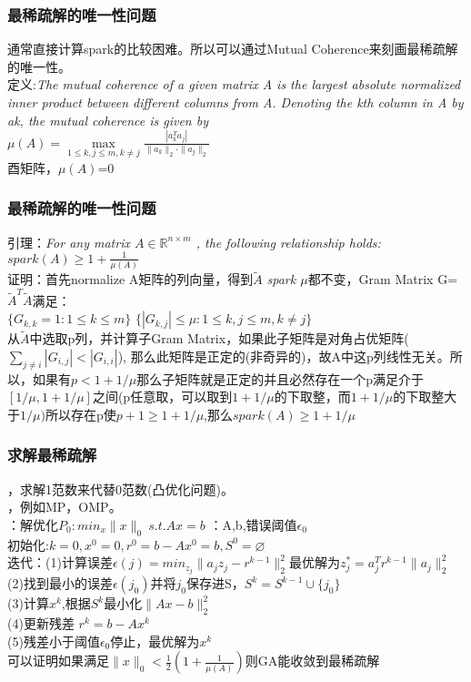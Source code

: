 \documentclass[UTF8]{beamer}
\begin{document}
\begin{frame}\frametitle{最稀疏解的唯一性问题}
通常直接计算spark的比较困难。所以可以通过Mutual Coherence来刻画最稀疏解的唯一性。\\
定义:\emph{The mutual coherence of a given matrix A
is the largest absolute normalized inner product between different columns from A.
Denoting the kth column in A by ak, the mutual coherence is given by}\\
\hspace{2cm}$\mu(A)=\max \limits_{1 \leqslant k,j \leqslant m,k \neq j} \frac{|a_{k}^{T}a_{j}|}{\|a_{k}\|_{2}\cdot \|a_{j}\|_{2}}$\\
酉矩阵，$\mu(A)$=0 
\end{frame}
\begin{frame}\frametitle{最稀疏解的唯一性问题}
引理：\emph{For any matrix $ A \in \mathbb{R}^{n \times m }$ , the following relationship holds:\\
\hspace{3cm}$spark(A) \geqslant 1+\frac{1}{\mu(A)}$}\\
证明：首先normalize A矩阵的列向量，得到$ \widetilde{A}$ \emph{spark $\mu$}都不变，Gram Matrix G=$ \widetilde{A}^{T}\widetilde{A} $满足：\\
${\{G_{k,k}=1:1 \leqslant k \leqslant m\}}$  ${\{|G_{k,j}| \leqslant \mu: 1 \leqslant k,j \leqslant m, k \neq j\}}$\\
从$ \widetilde{A}$中选取p列，并计算子Gram Matrix，如果此子矩阵是对角占优矩阵($\sum_{j \neq i} |G_{i,j}| < |G_{i,i}|$),
那么此矩阵是正定的(非奇异的)，故A中这p列线性无关。所以，如果有$p<1+1/\mu$那么子矩阵就是正定的并且必然存在一个p满足介于$[1/\mu,1+1/\mu]$之间(p任意取，可以取到$1+1/\mu$的下取整，而$1+1/\mu$的下取整大于$1/\mu)$所以存在p使$p+1 \geqslant 1+1/\mu$,那么$spark(A) \geqslant1+1/\mu$
\end{frame}
\begin{frame}\frametitle{求解最稀疏解}
，求解1范数来代替0范数(凸优化问题)。\\
，例如MP，OMP。\\
：解优化$P_{0}: min_{x} \|x\|_{0} \ s.t. Ax=b$
：A,b,错误阈值$\epsilon_{0}$\\
\noindent 初始化:$k=0,x^{0}=0,r^{0}=b-Ax^{0}=b ,S^{0}=\varnothing$\\
\noindent 迭代：(1)计算误差$\epsilon(j)=min_{z_{j}}\|a_{j}z_{j}-r^{k-1} \|_{2}^{2}$最优解为$z_{j}^{*}=a_{j}^{T}r^{k-1}\| a_{j}\|_{2}^{2}$\\
\noindent (2)找到最小的误差$\epsilon(j_{0})$并将$j_{0}$保存进S，$S^{k}=S^{k-1}\cup\{j_{0}\}$\\
\noindent (3)计算$x^{k}$,根据$S^{k}$最小化$\|Ax-b\|_{2}^{2}$\\
\noindent (4)更新残差 $r^{k}=b-Ax^{k}$\\
\noindent (5)残差小于阈值$\epsilon_{0}$停止，最优解为$x^{k}$\\
\noindent 可以证明如果满足$\|x\|_{0}<\frac{1}{2}(1+\frac{1}{\mu(A)})$则GA能收敛到最稀疏解
\end{frame}
\end{document}
